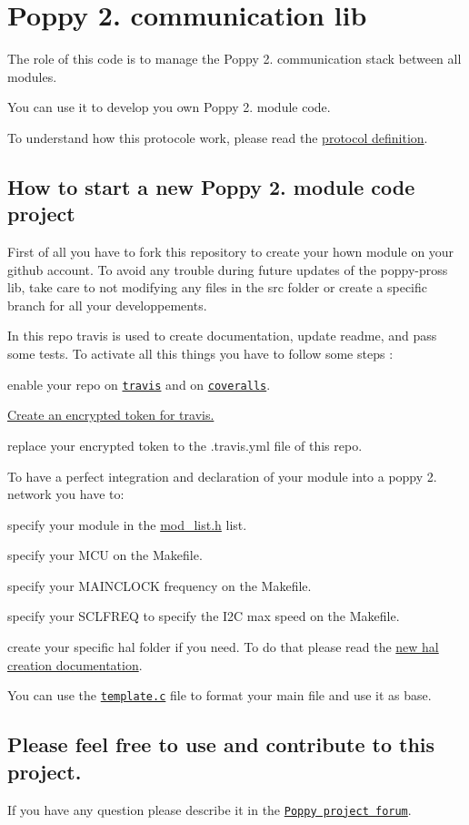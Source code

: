 \section*{Poppy 2. communication lib }

The role of this code is to manage the Poppy 2. communication stack between all modules.

You can use it to develop you own Poppy 2. module code.

To understand how this protocole work, please read the \hyperlink{protocol__definition_8md_source}{protocol definition}.

\subsection*{How to start a new Poppy 2. module code project }

First of all you have to fork this repository to create your hown module on your github account. To avoid any trouble during future updates of the poppy-\/pross lib, take care to not modifying any files in the src folder or create a specific branch for all your developpements. 



In this repo travis is used to create documentation, update readme, and pass some tests. To activate all this things you have to follow some steps \-:
\begin{DoxyItemize}
\item enable your repo on \href{https://travis-ci.org/}{\tt travis} and on \href{https://coveralls.io}{\tt coveralls}.
\item \hyperlink{travis__encrypt_8md_source}{Create an encrypted token for travis.}
\item replace your encrypted token to the .travis.\-yml file of this repo.
\end{DoxyItemize}





To have a perfect integration and declaration of your module into a poppy 2. network you have to\-:
\begin{DoxyItemize}
\item specify your module in the \hyperlink{mod__list_8h_source}{mod\-\_\-list.\-h} list.
\item specify your M\-C\-U on the Makefile.
\item specify your M\-A\-I\-N\-C\-L\-O\-C\-K frequency on the Makefile.
\item specify your S\-C\-L\-F\-R\-E\-Q to specify the I2\-C max speed on the Makefile.
\item create your specific hal folder if you need. To do that please read the \hyperlink{hal__creation_8md_source}{new hal creation documentation}.
\end{DoxyItemize}

You can use the \href{template.c}{\tt template.\-c} file to format your main file and use it as base.





\subsection*{Please feel free to use and contribute to this project. }

If you have any question please describe it in the \href{https://forum.poppy-project.org}{\tt Poppy project forum}. 